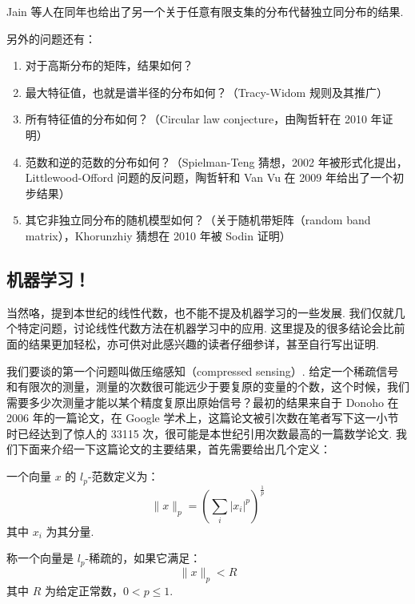 Jain 等人在同年也给出了另一个关于任意有限支集的分布代替独立同分布的结果.

另外的问题还有：
\begin{enumerate}
    \item 对于高斯分布的矩阵，结果如何？

    \item 最大特征值，也就是谱半径的分布如何？（Tracy-Widom 规则及其推广）

    \item 所有特征值的分布如何？（Circular law conjecture，由陶哲轩在 2010 年证明）

    \item 范数和逆的范数的分布如何？（Spielman-Teng 猜想，2002 年被形式化提出，Littlewood-Offord 问题的反问题，陶哲轩和 Van Vu 在 2009 年给出了一个初步结果）

    \item 其它非独立同分布的随机模型如何？（关于随机带矩阵（random band matrix），Khorunzhiy 猜想在 2010 年被 Sodin 证明）
\end{enumerate}

\subsection{机器学习！}

当然咯，提到本世纪的线性代数，也不能不提及机器学习的一些发展. 我们仅就几个特定问题，讨论线性代数方法在机器学习中的应用. 这里提及的很多结论会比前面的结果更加轻松，亦可供对此感兴趣的读者仔细参详，甚至自行写出证明.

我们要谈的第一个问题叫做压缩感知（compressed sensing）. 给定一个稀疏信号和有限次的测量，测量的次数很可能远少于要复原的变量的个数，这个时候，我们需要多少次测量才能以某个精度复原出原始信号？最初的结果来自于 Donoho 在 2006 年的一篇论文，在 Google 学术上，这篇论文被引次数在笔者写下这一小节时已经达到了惊人的 33115 次，很可能是本世纪引用次数最高的一篇数学论文. 我们下面来介绍一下这篇论文的主要结果，首先需要给出几个定义：

\begin{definition}
    一个向量 $x$ 的 $l_p$-范数定义为：
    \[ \lVert x \rVert_p = \left( \sum_{i}|x_i|^p \right)^{\frac{1}{p}} \]
    其中 $x_i$ 为其分量.
\end{definition}

\begin{definition}
    称一个向量是 $l_p$-稀疏的，如果它满足：
    \[ \lVert x \rVert_p < R \]
    其中 $R$ 为给定正常数，$0 < p \leqslant 1$.
\end{definition}

